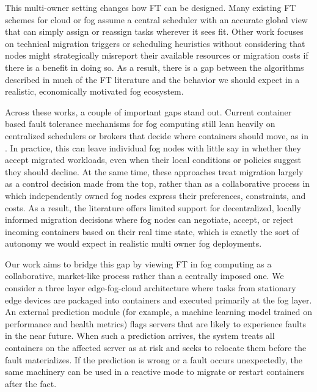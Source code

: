 \documentclass{article}
\begin{document}
This multi-owner setting changes how FT can be designed. Many existing FT schemes for cloud or fog assume a central scheduler with an accurate global view that can simply assign or reassign tasks wherever it sees fit. Other work focuses on technical migration triggers or scheduling heuristics without considering that nodes might strategically misreport their available resources or migration costs if there is a benefit in doing so. As a result, there is a gap between the algorithms described in much of the FT literature and the behavior we should expect in a realistic, economically motivated fog ecosystem.


Across these works, a couple of important gaps stand out. Current container based fault tolerance mechanisms for fog computing still lean heavily on centralized schedulers or brokers that decide where containers should move, as in \cite{palaContainerMigrationApproach2025,kashyapHybridApproachFaulttolerance2024b}. In practice, this can leave individual fog nodes with little say in whether they accept migrated workloads, even when their local conditions or policies suggest they should decline. At the same time, these approaches treat migration largely as a control decision made from the top, rather than as a collaborative process in which independently owned fog nodes express their preferences, constraints, and costs. As a result, the literature offers limited support for decentralized, locally informed migration decisions where fog nodes can negotiate, accept, or reject incoming containers based on their real time state, which is exactly the sort of autonomy we would expect in realistic multi owner fog deployments.


Our work aims to bridge this gap by viewing FT in fog computing as a collaborative, market-like process rather than a centrally imposed one. We consider a three layer edge-fog-cloud architecture where tasks from stationary edge devices are packaged into containers and executed primarily at the fog layer. An external prediction module (for example, a machine learning model trained on performance and health metrics) flags servers that are likely to experience faults in the near future. When such a prediction arrives, the system treats all containers on the affected server as at risk and seeks to relocate them before the fault materializes. If the prediction is wrong or a fault occurs unexpectedly, the same machinery can be used in a reactive mode to migrate or restart containers after the fact.
\end{document}
